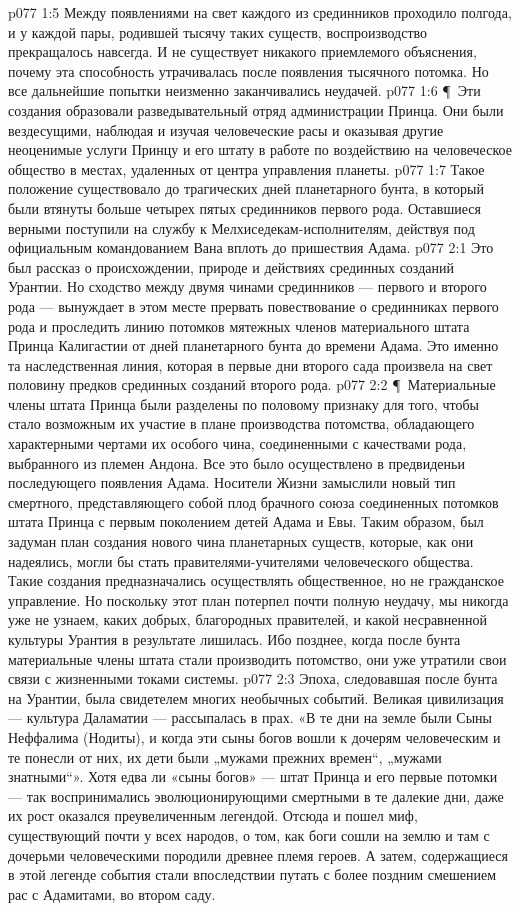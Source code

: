 \vs p077 1:5 Между появлениями на свет каждого из срединников проходило полгода, и у каждой пары, родившей тысячу таких существ, воспроизводство прекращалось навсегда. И не существует никакого приемлемого объяснения, почему эта способность утрачивалась после появления тысячного потомка. Но все дальнейшие попытки неизменно заканчивались неудачей.
\vs p077 1:6 \P\ Эти создания образовали разведывательный отряд администрации Принца. Они были вездесущими, наблюдая и изучая человеческие расы и оказывая другие неоценимые услуги Принцу и его штату в работе по воздействию на человеческое общество в местах, удаленных от центра управления планеты.
\vs p077 1:7 Такое положение существовало до трагических дней планетарного бунта, в который были втянуты больше четырех пятых срединников первого рода. Оставшиеся верными поступили на службу к Мелхиседекам\hyp{}исполнителям, действуя под официальным командованием Вана вплоть до пришествия Адама.
\vs p077 2:1 Это был рассказ о происхождении, природе и действиях срединных созданий Урантии. Но сходство между двумя чинами срединников --- первого и второго рода --- вынуждает в этом месте прервать повествование о срединниках первого рода и проследить линию потомков мятежных членов материального штата Принца Калигастии от дней планетарного бунта до времени Адама. Это именно та наследственная линия, которая в первые дни второго сада произвела на свет половину предков срединных созданий второго рода.
\vs p077 2:2 \P\ Материальные члены штата Принца были разделены по половому признаку для того, чтобы стало возможным их участие в плане производства потомства, обладающего характерными чертами их особого чина, соединенными с качествами рода, выбранного из племен Андона. Все это было осуществлено в предвиденьи последующего появления Адама. Носители Жизни замыслили новый тип смертного, представляющего собой плод брачного союза соединенных потомков штата Принца с первым поколением детей Адама и Евы. Таким образом, был задуман план создания нового чина планетарных существ, которые, как они надеялись, могли бы стать правителями\hyp{}учителями человеческого общества. Такие создания предназначались осуществлять общественное, но не гражданское управление. Но поскольку этот план потерпел почти полную неудачу, мы никогда уже не узнаем, каких добрых, благородных правителей, и какой несравненной культуры Урантия в результате лишилась. Ибо позднее, когда после бунта материальные члены штата стали производить потомство, они уже утратили свои связи с жизненными токами системы.
\vs p077 2:3 Эпоха, следовавшая после бунта на Урантии, была свидетелем многих необычных событий. Великая цивилизация --- культура Даламатии --- рассыпалась в прах. «В те дни на земле были Сыны Неффалима (Нодиты), и когда эти сыны богов вошли к дочерям человеческим и те понесли от них, их дети были „мужами прежних времен“, „мужами знатными“». Хотя едва ли «сыны богов» --- штат Принца и его первые потомки --- так воспринимались эволюционирующими смертными в те далекие дни, даже их рост оказался преувеличенным легендой. Отсюда и пошел миф, существующий почти у всех народов, о том, как боги сошли на землю и там с дочерьми человеческими породили древнее племя героев. А затем, содержащиеся в этой легенде события стали впоследствии путать с более поздним смешением рас с Адамитами, во втором саду.
